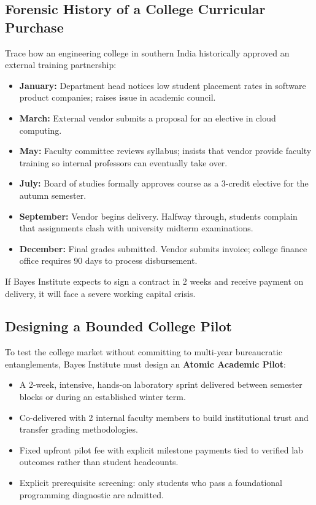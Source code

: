 \subsection{Forensic History of a College Curricular Purchase}

Trace how an engineering college in southern India historically approved an external training partnership:
\begin{itemize}[leftmargin=1.2em,itemsep=0.2ex]
  \item \textbf{January:} Department head notices low student placement rates in software product companies; raises issue in academic council.
  \item \textbf{March:} External vendor submits a proposal for an elective in cloud computing.
  \item \textbf{May:} Faculty committee reviews syllabus; insists that vendor provide faculty training so internal professors can eventually take over.
  \item \textbf{July:} Board of studies formally approves course as a 3-credit elective for the autumn semester.
  \item \textbf{September:} Vendor begins delivery. Halfway through, students complain that assignments clash with university midterm examinations.
  \item \textbf{December:} Final grades submitted. Vendor submits invoice; college finance office requires 90 days to process disbursement.
\end{itemize}
If Bayes Institute expects to sign a contract in 2 weeks and receive payment on delivery, it will face a severe working capital crisis.

\subsection{Designing a Bounded College Pilot}

To test the college market without committing to multi-year bureaucratic entanglements, Bayes Institute must design an \textbf{Atomic Academic Pilot}:
\begin{itemize}[leftmargin=1.2em,itemsep=0.2ex]
  \item A 2-week, intensive, hands-on laboratory sprint delivered between semester blocks or during an established winter term.
  \item Co-delivered with 2 internal faculty members to build institutional trust and transfer grading methodologies.
  \item Fixed upfront pilot fee with explicit milestone payments tied to verified lab outcomes rather than student headcounts.
  \item Explicit prerequisite screening: only students who pass a foundational programming diagnostic are admitted.
\end{itemize}


